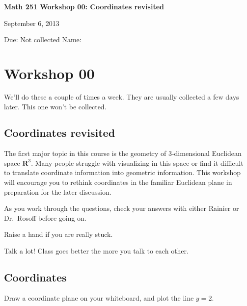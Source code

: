 \documentclass[12pt]{exam}
\theoremstyle{definition}
\begin{document}
\lstset{language=R}
\noindent
\textbf{{\large Math 251 \hfill Workshop 00: Coordinates revisited}}

\noindent
September 6, 2013 

\noindent
Due: Not collected \hfill Name: \underline{\hspace{3in}} 

\noindent

\section{Workshop 00}

We'll do these a couple of times a week. They are usually collected a
few days later. This one won't be collected.

\subsection{Coordinates revisited}

The first major topic in this course is the geometry of 3-dimensional
Euclidean space $\mathbf{R}^3$. Many people struggle with visualizing in
this space or find it difficult to translate coordinate information into
geometric information. This workshop will encourage you to rethink
coordinates in the familiar Euclidean plane in preparation for the later
discussion.

\begin{compactitem}
    \item As you work through the questions, check your answers with either Rainier or Dr.\ Rosoff before going on. 
    \item Raise a hand if you are really stuck. 
    \item Talk a lot! Class goes better the more you talk to each other.
\end{compactitem}

\subsection{Coordinates}

Draw a coordinate plane on your whiteboard, and plot the line $y = 2$.
\end{document}
